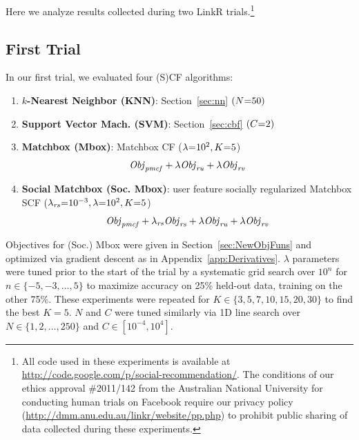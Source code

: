 
Here we analyze results collected during two LinkR 
trials.\footnote{All code used in these experiments is available at
\url{http://code.google.com/p/social-recommendation/}.  The conditions
of our ethics approval \#2011/142 from the Australian National
University for conducting human trials on Facebook require our
privacy policy
(\url{http://dmm.anu.edu.au/linkr/website/pp.php}) to
prohibit public sharing of data collected during these experiments.}

\subsection{First Trial}

In our first trial, we evaluated four (S)CF algorithms:
\denselist
\begin{enumerate}
\item {\bf $k$-Nearest Neighbor (KNN)}: Section~\ref{sec:nn} $(N\hspace{-.9mm}=\hspace{-.9mm}50)$
\item {\bf Support Vector Mach. \sq(SVM)}: Section~\ref{sec:cbf} $(C\hspace{-.9mm}=\hspace{-.9mm}2)$
\item {\bf Matchbox (Mbox)}: Matchbox CF ($\lambda\hspace{-.9mm}=\hspace{-.9mm}10^2, K\hspace{-.9mm}=\hspace{-.9mm}5$) %
$$\mathit{Obj}_{\mathit{pmcf}} + \lambda \mathit{Obj}_{\mathit{ru}} + \lambda \mathit{Obj}_{\mathit{rv}}$$
\item {\bf Social Matchbox (Soc. \sqt Mbox)}: \sq
user feature socially regularized Matchbox SCF 
($\lambda_{\mathit{rs}}\hspace{-.9mm}=\hspace{-.9mm}10^{-3}, \lambda\hspace{-.9mm}=\hspace{-.9mm}10^2, K\hspace{-.9mm}=\hspace{-.9mm}5$)
$$\mathit{Obj}_{\mathit{pmcf}} + \lambda_{\mathit{rs}} \mathit{Obj}_{\mathit{rs}} + \lambda \mathit{Obj}_{\mathit{ru}} + \lambda \mathit{Obj}_{\mathit{rv}}$$
\end{enumerate}
Objectives for (Soc.) Mbox were given in Section~\ref{sec:NewObjFuns}
and optimized via gradient descent as in
Appendix~\ref{app:Derivatives}. $\lambda$ parameters were tuned prior
to the start of the trial by a systematic grid search over $10^n$ for
$n \in \{ -5,-3,\ldots,5 \}$ to maximize accuracy on 25\% held-out
data, training on the other 75\%.  These experiments were repeated for
$K \in \{ 3,5,7,10,15,20,30 \}$ to find the best $K=5$.  $N$ and $C$ were
tuned similarly via 1D line search over $N \in \{ 1,2,\ldots,250 \}$ and $C
\in [10^{-4},10^4]$.

